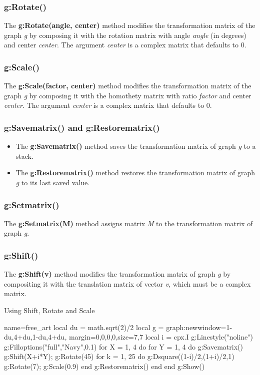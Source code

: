 \subsubsection{g:Rotate()}
The \textbf{g:Rotate(angle, center)} method modifies the transformation matrix of the graph \emph g by composing it with the rotation matrix with angle \emph{angle} (in degrees) and center \emph{center}. The argument \emph{center} is a complex matrix that defaults to $0$.

\subsubsection{g:Scale()}
The \textbf{g:Scale(factor, center)} method modifies the transformation matrix of the graph \emph g by composing it with the homothety matrix with ratio \emph{factor} and center \emph{center}. The argument \emph{center} is a complex matrix that defaults to $0$.

\subsubsection{g:Savematrix() and g:Restorematrix()}
\begin{itemize}
    \item The \textbf{g:Savematrix()} method saves the transformation matrix of graph \emph g to a stack.
    \item The \textbf{g:Restorematrix()} method restores the transformation matrix of graph \emph g to its last saved value.
\end{itemize}

\subsubsection{g:Setmatrix()}
The \textbf{g:Setmatrix(M)} method assigns matrix \emph M to the transformation matrix of graph \emph g.

\subsubsection{g:Shift()}
The \textbf{g:Shift(v)} method modifies the transformation matrix of graph \emph g by compositing it with the translation matrix of vector \emph{v}, which must be a complex matrix.

\begin{demo}{Using Shift, Rotate and Scale}
\begin{luadraw}{name=free_art}
local du = math.sqrt(2)/2
local g = graph:new{window={1-du,4+du,1-du,4+du},
            margin={0,0,0,0},size={7,7}}
local i = cpx.I
g:Linestyle("noline")
g:Filloptions("full","Navy",0.1)
for X = 1, 4 do
    for Y = 1, 4 do
        g:Savematrix()
        g:Shift(X+i*Y); g:Rotate(45)
        for k = 1, 25 do
            g:Dsquare((1-i)/2,(1+i)/2,1)
            g:Rotate(7); g:Scale(0.9)
        end
        g:Restorematrix()
    end
end
g:Show()
\end{luadraw}
\end{demo}

